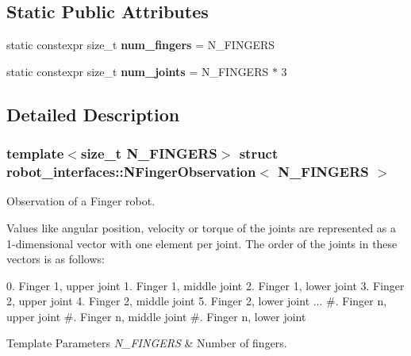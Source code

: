 \subsection*{Static Public Attributes}
\begin{DoxyCompactItemize}
\item 
\mbox{\label{structrobot__interfaces_1_1NFingerObservation_ac3e7fa7d87b5af61378985e541152d46}} 
static constexpr size\+\_\+t {\bfseries num\+\_\+fingers} = N\+\_\+\+F\+I\+N\+G\+E\+RS
\item 
\mbox{\label{structrobot__interfaces_1_1NFingerObservation_a52ba830179e60bdf07c90df1614bad11}} 
static constexpr size\+\_\+t {\bfseries num\+\_\+joints} = N\+\_\+\+F\+I\+N\+G\+E\+RS $\ast$ 3
\end{DoxyCompactItemize}


\subsection{Detailed Description}
\subsubsection*{template$<$size\+\_\+t N\+\_\+\+F\+I\+N\+G\+E\+RS$>$\newline
struct robot\+\_\+interfaces\+::\+N\+Finger\+Observation$<$ N\+\_\+\+F\+I\+N\+G\+E\+R\+S $>$}

Observation of a Finger robot. 

Values like angular position, velocity or torque of the joints are represented as a 1-\/dimensional vector with one element per joint. The order of the joints in these vectors is as follows\+: \begin{DoxyVerb}0. Finger 1, upper joint
1. Finger 1, middle joint
2. Finger 1, lower joint
3. Finger 2, upper joint
4. Finger 2, middle joint
5. Finger 2, lower joint
...
#. Finger n, upper joint
#. Finger n, middle joint
#. Finger n, lower joint
\end{DoxyVerb}



\begin{DoxyTemplParams}{Template Parameters}
{\em N\+\_\+\+F\+I\+N\+G\+E\+RS} & Number of fingers. \\
\hline
\end{DoxyTemplParams}


